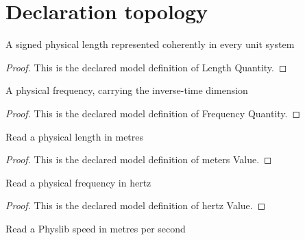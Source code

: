 \section{Declaration topology}
\begin{definition}
  \label{def:physics:phyx-mini-0173:phyxminiproblems-problemphyxmini0173-lengthquantity}
  A signed physical length represented coherently in every unit system
\end{definition}
\begin{proof}
  This is the declared model definition of Length Quantity.
\end{proof}
\begin{definition}
  \label{def:physics:phyx-mini-0173:phyxminiproblems-problemphyxmini0173-frequencyquantity}
  A physical frequency, carrying the inverse-time dimension
\end{definition}
\begin{proof}
  This is the declared model definition of Frequency Quantity.
\end{proof}
\begin{definition}
  \label{def:physics:phyx-mini-0173:phyxminiproblems-problemphyxmini0173-metersvalue}
  Read a physical length in metres
\end{definition}
\begin{proof}
  This is the declared model definition of meters Value.
\end{proof}
\begin{definition}
  \label{def:physics:phyx-mini-0173:phyxminiproblems-problemphyxmini0173-hertzvalue}
  Read a physical frequency in hertz
\end{definition}
\begin{proof}
  This is the declared model definition of hertz Value.
\end{proof}
\begin{definition}
  \label{def:physics:phyx-mini-0173:phyxminiproblems-problemphyxmini0173-meterspersecondvalue}
  Read a Physlib speed in metres per second
\end{definition}
